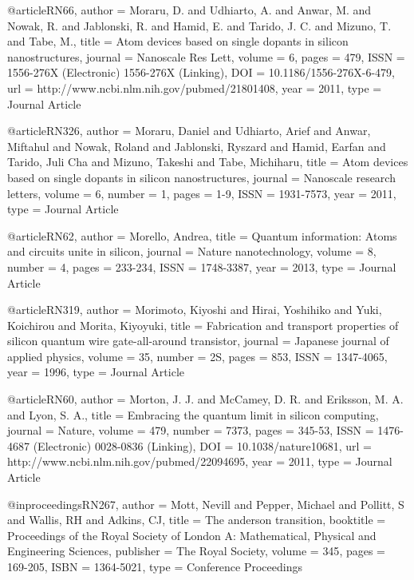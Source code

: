 @article{RN66,
   author = {Moraru, D. and Udhiarto, A. and Anwar, M. and Nowak, R. and Jablonski, R. and Hamid, E. and Tarido, J. C. and Mizuno, T. and Tabe, M.},
   title = {Atom devices based on single dopants in silicon nanostructures},
   journal = {Nanoscale Res Lett},
   volume = {6},
   pages = {479},
   ISSN = {1556-276X (Electronic)
1556-276X (Linking)},
   DOI = {10.1186/1556-276X-6-479},
   url = {http://www.ncbi.nlm.nih.gov/pubmed/21801408},
   year = {2011},
   type = {Journal Article}
}

@article{RN326,
   author = {Moraru, Daniel and Udhiarto, Arief and Anwar, Miftahul and Nowak, Roland and Jablonski, Ryszard and Hamid, Earfan and Tarido, Juli Cha and Mizuno, Takeshi and Tabe, Michiharu},
   title = {Atom devices based on single dopants in silicon nanostructures},
   journal = {Nanoscale research letters},
   volume = {6},
   number = {1},
   pages = {1-9},
   ISSN = {1931-7573},
   year = {2011},
   type = {Journal Article}
}

@article{RN62,
   author = {Morello, Andrea},
   title = {Quantum information: Atoms and circuits unite in silicon},
   journal = {Nature nanotechnology},
   volume = {8},
   number = {4},
   pages = {233-234},
   ISSN = {1748-3387},
   year = {2013},
   type = {Journal Article}
}

@article{RN319,
   author = {Morimoto, Kiyoshi and Hirai, Yoshihiko and Yuki, Koichirou and Morita, Kiyoyuki},
   title = {Fabrication and transport properties of silicon quantum wire gate-all-around transistor},
   journal = {Japanese journal of applied physics},
   volume = {35},
   number = {2S},
   pages = {853},
   ISSN = {1347-4065},
   year = {1996},
   type = {Journal Article}
}

@article{RN60,
   author = {Morton, J. J. and McCamey, D. R. and Eriksson, M. A. and Lyon, S. A.},
   title = {Embracing the quantum limit in silicon computing},
   journal = {Nature},
   volume = {479},
   number = {7373},
   pages = {345-53},
   ISSN = {1476-4687 (Electronic)
0028-0836 (Linking)},
   DOI = {10.1038/nature10681},
   url = {http://www.ncbi.nlm.nih.gov/pubmed/22094695},
   year = {2011},
   type = {Journal Article}
}

@inproceedings{RN267,
   author = {Mott, Nevill and Pepper, Michael and Pollitt, S and Wallis, RH and Adkins, CJ},
   title = {The anderson transition},
   booktitle = {Proceedings of the Royal Society of London A: Mathematical, Physical and Engineering Sciences},
   publisher = {The Royal Society},
   volume = {345},
   pages = {169-205},
   ISBN = {1364-5021},
   type = {Conference Proceedings}
}

